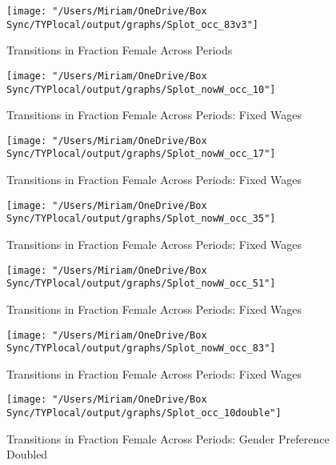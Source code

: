 \documentclass[12pt]{article}
\begin{document}
\begin{figure}[H]
\centering
\caption{Transitions in Fraction Female Across Periods}
\label{transitions83}
\texttt{[image: "/Users/Miriam/OneDrive/Box Sync/TYPlocal/output/graphs/Splot\_occ\_83v3"]}
\end{figure}

\begin{figure}[H]
\centering
\caption{Transitions in Fraction Female Across Periods: Fixed Wages}
\label{ftransitions10}
\texttt{[image: "/Users/Miriam/OneDrive/Box Sync/TYPlocal/output/graphs/Splot\_nowW\_occ\_10"]}
\end{figure}

\begin{figure}[H]
\centering
\caption{Transitions in Fraction Female Across Periods: Fixed Wages}
\label{ftransitions17}
\texttt{[image: "/Users/Miriam/OneDrive/Box Sync/TYPlocal/output/graphs/Splot\_nowW\_occ\_17"]}
\end{figure}

\begin{figure}[H]
\centering
\caption{Transitions in Fraction Female Across Periods: Fixed Wages}
\label{ftransitions35}
\texttt{[image: "/Users/Miriam/OneDrive/Box Sync/TYPlocal/output/graphs/Splot\_nowW\_occ\_35"]}
\end{figure}

\begin{figure}[H]
\centering
\caption{Transitions in Fraction Female Across Periods: Fixed Wages}
\label{ftransitions51}
\texttt{[image: "/Users/Miriam/OneDrive/Box Sync/TYPlocal/output/graphs/Splot\_nowW\_occ\_51"]}
\end{figure}

\begin{figure}[H]
\centering
\caption{Transitions in Fraction Female Across Periods: Fixed Wages}
\label{ftransitions83}
\texttt{[image: "/Users/Miriam/OneDrive/Box Sync/TYPlocal/output/graphs/Splot\_nowW\_occ\_83"]}
\end{figure}


\begin{figure}[H]
\centering
\caption{Transitions in Fraction Female Across Periods: Gender Preference Doubled}
\label{ftransitions10}
\texttt{[image: "/Users/Miriam/OneDrive/Box Sync/TYPlocal/output/graphs/Splot\_occ\_10double"]}
\end{figure}
\end{document}

